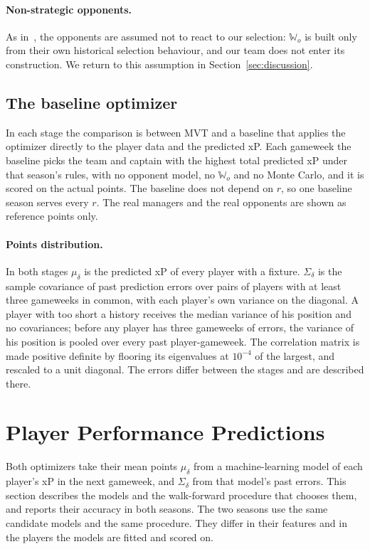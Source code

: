 \documentclass[12pt,oneside,a4paper]{book}
\theoremstyle{definition}
\theoremstyle{remark}
\begin{document}
	\paragraph{Non-strategic opponents.} As in~\cite{haugh2021play}, the opponents are assumed not to
	react to our selection: $\mathbb{W}_o$ is built only from their own historical selection
	behaviour, and our team does not enter its construction. We return to this assumption in
	Section~\ref{sec:discussion}.

	\subsection{The baseline optimizer}
	\label{sec:design-baseline}

	In each stage the comparison is between MVT and a baseline that applies the optimizer directly
	to the player data and the predicted xP. Each gameweek the baseline picks the team and captain
	with the highest total predicted xP under that season's rules, with no opponent model, no
	$\mathbb{W}_o$ and no Monte Carlo, and it is scored on the actual points. The baseline does not
	depend on $r$, so one baseline season serves every $r$. The real managers and the real opponents
	are shown as reference points only.

	\paragraph{Points distribution.} In both stages $\mu_\delta$ is the predicted xP of every player
	with a fixture. $\Sigma_\delta$ is the sample covariance of past prediction errors over pairs of
	players with at least three gameweeks in common, with each player's own variance on the
	diagonal. A player with too short a history receives the median variance of his position and no
	covariances; before any player has three gameweeks of errors, the variance of his position is
	pooled over every past player-gameweek. The correlation matrix is made positive definite by
	flooring its eigenvalues at $10^{-4}$ of the largest, and rescaled to a unit diagonal. The
	errors differ between the stages and are described there.

	\section{Player Performance Predictions}
	\label{sec:predictions}

	Both optimizers take their mean points $\mu_\delta$ from a machine-learning model of each
	player's xP in the next gameweek, and $\Sigma_\delta$ from that model's past errors. This
	section describes the models and the walk-forward procedure that chooses them, and reports
	their accuracy in both seasons. The two seasons use the same candidate models and the same
	procedure. They differ in their features and in the players the models are fitted and scored
	on.
\end{document}
